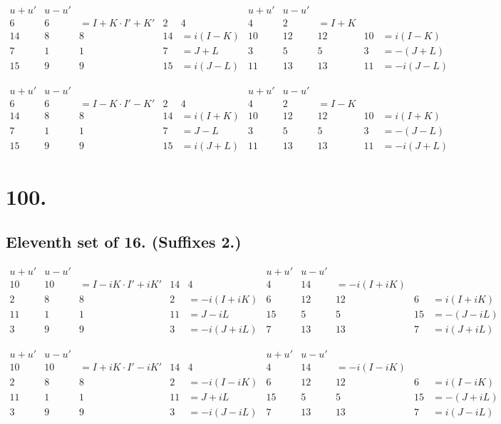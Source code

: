 \documentclass[11pt,a4paper]{book}
\begin{document}
\[
\begin{array}{c|cccc|c|cccc}
u+u' & u-u' & & & & u+u' & u-u' & & & \\
\hline
6 & 6 & = I+K \cdot I'+K' & 2 & 4 & 4 & 2 & = I+K \\
14 & 8 & 8 & 14 & = i(I-K) & 10 & 12 & 12 & 10 & = i(I-K) \\
7 & 1 & 1 & 7 & = J+L & 3 & 5 & 5 & 3 & = -(J+L) \\
15 & 9 & 9 & 15 & = i(J-L) & 11 & 13 & 13 & 11 & = -i(J-L)
\end{array}
\]

\[
\begin{array}{c|cccc|c|cccc}
u+u' & u-u' & & & & u+u' & u-u' & & & \\
\hline
6 & 6 & = I-K \cdot I'-K' & 2 & 4 & 4 & 2 & = I-K \\
14 & 8 & 8 & 14 & = i(I+K) & 10 & 12 & 12 & 10 & = i(I+K) \\
7 & 1 & 1 & 7 & = J-L & 3 & 5 & 5 & 3 & = -(J-L) \\
15 & 9 & 9 & 15 & = i(J+L) & 11 & 13 & 13 & 11 & = -i(J+L)
\end{array}
\]

\newpage
\section*{100.}
\label{sec:100}

\subsection*{Eleventh set of 16. (Suffixes 2.)}

\[
\begin{array}{c|cccc|c|cccc}
u+u' & u-u' & & & & u+u' & u-u' & & & \\
\hline
10 & 10 & = I-iK \cdot I'+iK' & 14 & 4 & 4 & 14 & = -i(I+iK) \\
2 & 8 & 8 & 2 & = -i(I+iK) & 6 & 12 & 12 & 6 & = i(I+iK) \\
11 & 1 & 1 & 11 & = J-iL & 15 & 5 & 5 & 15 & = -(J-iL) \\
3 & 9 & 9 & 3 & = -i(J+iL) & 7 & 13 & 13 & 7 & = i(J+iL)
\end{array}
\]

\[
\begin{array}{c|cccc|c|cccc}
u+u' & u-u' & & & & u+u' & u-u' & & & \\
\hline
10 & 10 & = I+iK \cdot I'-iK' & 14 & 4 & 4 & 14 & = -i(I-iK) \\
2 & 8 & 8 & 2 & = -i(I-iK) & 6 & 12 & 12 & 6 & = i(I-iK) \\
11 & 1 & 1 & 11 & = J+iL & 15 & 5 & 5 & 15 & = -(J+iL) \\
3 & 9 & 9 & 3 & = -i(J-iL) & 7 & 13 & 13 & 7 & = i(J-iL)
\end{array}
\]
\end{document}
